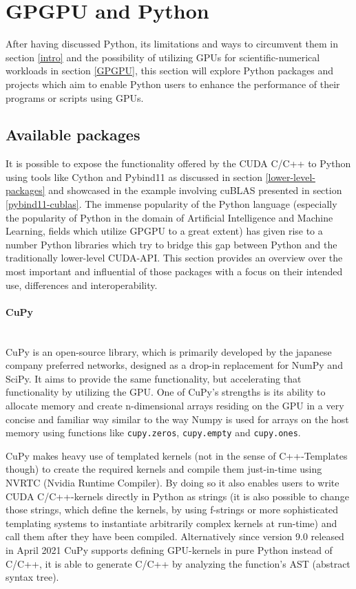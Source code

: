 \documentclass[english,11pt,a4paper,table]{article} %
\let\stdsection\section %
\renewcommand\section{\clearpage\newpage\stdsection} %
\begin{document}
\section{GPGPU and Python}
\label{cuda_python}

After having discussed Python, its limitations and ways to circumvent them in section \ref{intro} and the possibility of utilizing GPUs for scientific-numerical workloads in section \ref{GPGPU}, this section will explore Python packages and projects which aim to enable Python users to enhance the performance of their programs or scripts using GPUs.

\subsection{Available packages}
\label{python-packages}

It is possible to expose the functionality offered by the CUDA C/C++ to Python using tools like Cython and Pybind11 as discussed in section \ref{lower-level-packages} and showcased in the example involving cuBLAS presented in section \ref{pybind11-cublas}.
The immense popularity of the Python language (especially the popularity of Python in the domain of Artificial Intelligence and Machine Learning, fields which utilize GPGPU to a great extent) has given rise to a number Python libraries which try to bridge this gap between Python and the traditionally lower-level CUDA-API.
This section provides an overview over the most important and influential of those packages with a focus on their intended use, differences and interoperability.

\paragraph*{CuPy}\mbox{}\\

CuPy \cite{cupy_learningsys2017} is an open-source library, which is primarily developed by the japanese company preferred networks, designed as a drop-in replacement for NumPy and SciPy.
It aims to provide the same functionality, but accelerating that functionality by utilizing the GPU.
One of CuPy's strengths is its ability to allocate memory and create n-dimensional arrays residing on the GPU in a very concise and familiar way similar to the way Numpy is used for arrays on the host memory using functions like \texttt{cupy.zeros}, \texttt{cupy.empty} and \texttt{cupy.ones}.

CuPy makes heavy use of templated kernels (not in the sense of C++-Templates though) to create the required kernels and compile them just-in-time using NVRTC (Nvidia Runtime Compiler).
By doing so it also enables users to write CUDA C/C++-kernels directly in Python as strings (it is also possible to change those strings, which define the kernels, by using f-strings or more sophisticated templating systems to instantiate arbitrarily complex kernels at run-time) and call them after they have been compiled.
Alternatively since version 9.0 released in April 2021 CuPy supports defining GPU-kernels in pure Python instead of C/C++, it is able to generate C/C++ by analyzing the function's AST (abstract syntax tree).
\end{document}
